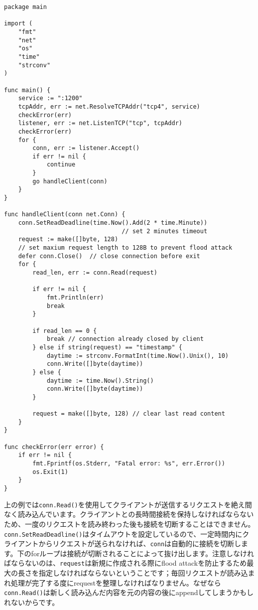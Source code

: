 \begin{lstlisting}[numbers=none]
package main

import (
    "fmt"
    "net"
    "os"
    "time"
    "strconv"
)

func main() {
    service := ":1200"
    tcpAddr, err := net.ResolveTCPAddr("tcp4", service)
    checkError(err)
    listener, err := net.ListenTCP("tcp", tcpAddr)
    checkError(err)
    for {
        conn, err := listener.Accept()
        if err != nil {
            continue
        }
        go handleClient(conn)
    }
}

func handleClient(conn net.Conn) {
    conn.SetReadDeadline(time.Now().Add(2 * time.Minute))
                                 // set 2 minutes timeout
    request := make([]byte, 128)
    // set maxium request length to 128B to prevent flood attack
    defer conn.Close()  // close connection before exit
    for {
        read_len, err := conn.Read(request)

        if err != nil {
            fmt.Println(err)
            break
        }

        if read_len == 0 {
            break // connection already closed by client
        } else if string(request) == "timestamp" {
            daytime := strconv.FormatInt(time.Now().Unix(), 10)
            conn.Write([]byte(daytime))
        } else {
            daytime := time.Now().String()
            conn.Write([]byte(daytime)) 
        }

        request = make([]byte, 128) // clear last read content
    }
}

func checkError(err error) {
    if err != nil {
        fmt.Fprintf(os.Stderr, "Fatal error: %s", err.Error())
        os.Exit(1)
    }
}
\end{lstlisting}

上の例では\texttt{conn.Read()}を使用してクライアントが送信するリクエストを絶え間なく読み込んでいます。クライアントとの長時間接続を保持しなければならないため、一度のリクエストを読み終わった後も接続を切断することはできません。\texttt{conn.SetReadDeadline()}はタイムアウトを設定しているので、一定時間内にクライアントからリクエストが送られなければ、\texttt{conn}は自動的に接続を切断します。下のforループは接続が切断されることによって抜け出します。注意しなければならないのは、\texttt{request}は新規に作成される際にflood attackを防止するため最大の長さを指定しなければならないということです；毎回リクエストが読み込まれ処理が完了する度にrequestを整理しなければなりません。なぜなら\texttt{conn.Read()}は新しく読み込んだ内容を元の内容の後にappendしてしまうかもしれないからです。
